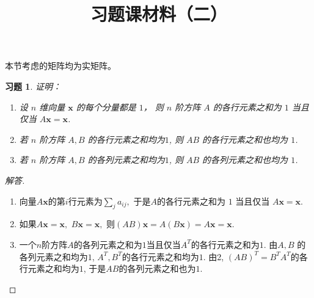 \documentclass[UTF8]{ctexart}
\newcommand\bs[1]{\boldsymbol{ #1}}
\newtheorem{ex}[thm]{习题}
\begin{document}
\title{习题课材料（二）}

\date{}

\maketitle

\vspace{-1cm}




\medskip

本节考虑的矩阵均为实矩阵。

\begin{ex}
证明：
\begin{enumerate}
	\item 设 $n$ 维向量 $\bs x$ 的每个分量都是 $1$， 则 $n$ 阶方阵  $A$ 的各行元素之和为 $1$ 当且仅当 $A \bs x=\bs x$.
	\item 若 $n$ 阶方阵 $A, B$ 的各行元素之和均为$1$, 则 $AB$ 的各行元素之和也均为 $1$.
	\item 若 $n$ 阶方阵 $A, B$ 的各列元素之和均为$1$, 则 $AB$ 的各列元素之和也均为 $1$.
\end{enumerate}
\end{ex}
\begin{proof}[解答]
\begin{enumerate}
\item 向量$A \bs x $的第$i$行元素为$\sum_j a_{ij} ,$ 于是$A$的各行元素之和为 $1$ 当且仅当 $A \bs x=\bs x$.

\item 如果$A \bs x = \bs x,$ $B\bs x = \bs x,$ 则$(AB)\bs x = A (B \bs x) = A \bs x = \bs x.$

\item 一个$n$阶方阵$A$的各列元素之和为$1$当且仅当$A^T$的各行元素之和为$1.$ 由$A, B$ 的各列元素之和均为$1$,  $A^T, B^T$的各行元素之和均为$1$. 由2, $(AB)^T = B^T A^T$的各行元素之和均为$1$, 于是$AB$的各列元素之和也为$1.$
\end{enumerate}
\end{proof}
\end{document}
